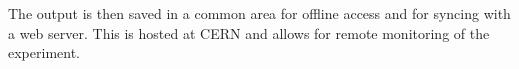 The output is then saved in a common area for offline access and for syncing
with a web server. This is hosted at CERN and allows for remote
monitoring of the experiment.





